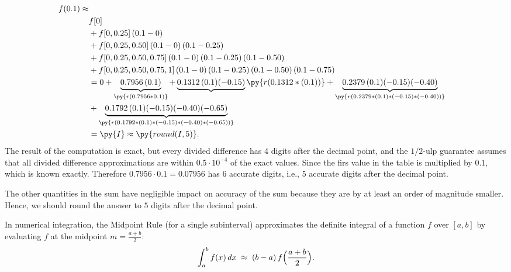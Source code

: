 \documentclass[11pt,letterpaper]{gradescopeexam}
\begin{document}
\begin{questions}
\begin{question}[10]
    \begin{solutionorbox}[4in]
      \[
      \begin{aligned}
        f(0.1) \approx \\
        & f[0] \\
        & + f[0,0.25]\,(0.1-0) \\
        & + f[0,0.25,0.50]\,(0.1-0)\,(0.1-0.25) \\
        & + f[0,0.25,0.50,0.75]\,(0.1-0)\,(0.1-0.25)\,(0.1-0.50) \\
        & + f[0,0.25,0.50,0.75,1]\,(0.1-0)\,(0.1-0.25)\,(0.1-0.50)\,(0.1-0.75) \\
        &= 0 
          + \underbrace{0.7956\,(0.1)}_{\py{r(0.7956*0.1)}}
          + \underbrace{0.1312\,(0.1)(-0.15)}{\py{r(0.1312*(0.1))}}
          + \underbrace{0.2379\,(0.1)(-0.15)(-0.40)}_{\py{r(0.2379*(0.1)*(-0.15)*(-0.40))}} \\
        & + \underbrace{0.1792\,(0.1)(-0.15)(-0.40)(-0.65)}_{\py{r(0.1792*(0.1)*(-0.15)*(-0.40)*(-0.65))}} \\
        &= \py{I} \approx\py{round(I,5)}.
      \end{aligned}
      \]
      The result of the computation is exact, but every divided
      difference has 4 digits after the decimal point, and the
      \(1/2\)-ulp guarantee assumes that all divided difference
      approximations are within \(0.5\cdot 10^{-4}\) of the exact
      values. Since the firs value in the table is multiplied by
      \(0.1\), which is known exactly. Therefore
      \(0.7956\cdot 0.1 = 0.07956 \) has \(6\) accurate digits, i.e.,
      \(5\) accurate digits after the decimal point.

      The other quantities in the sum have negligible impact
      on accuracy of the sum because they are by at least an order of magnitude
      smaller. Hence, we should round the answer to \(5\) digits
      after the decimal point.

    \end{solutionorbox}
  \end{question}    
  
  \begin{question}
    In numerical integration, the Midpoint Rule (for a single
    subinterval) approximates the definite integral of a function $f$
    over $[a,b]$ by evaluating $f$ at the midpoint $m = \frac{a+b}{2}$:
    \[
    \int_a^b f(x)\,dx 
    \;\approx\; 
    (b - a)\, f\Bigl(\frac{a + b}{2}\Bigr).
    \]


\end{question}
\end{questions}
\end{document}
